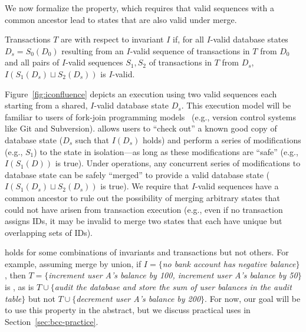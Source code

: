 We now formalize the \iconfluence property, which requires that valid
sequences with a common ancestor lead to states that are also valid
under merge.

\begin{definition}[\iconfluence]
Transactions $T$ are \iconfluent with respect to invariant $I$ if, for
all $I$-valid database states $D_s=S_0(D_0)$ resulting from an
$I$-valid sequence of transactions in $T$ from $D_0$ and all pairs of
$I$-valid sequences $S_1, S_2$ of transactions in $T$ from $D_s$,
$I(S_1(D_s) \sqcup S_2(D_s))$ is $I$-valid.
\end{definition}

Figure~\ref{fig:iconfluence} depicts an \iconfluent execution using
two valid sequences each starting from a shared, $I$-valid database
state $D_s$. This execution model will be familiar to users of
fork-join programming models~\cite{hewitt-forkjoin} (e.g., version
control systems like Git and Subversion). \iconfluence allows users to
``check out'' a known good copy of database state ($D_s$ such that
$I(D_s)$ holds) and perform a series of modifications (e.g., $S_1$) to
the state in isolation---as long as these modifications are ``safe''
(e.g., $I(S_1(D))$ is true). Under \iconfluent operations, any
concurrent series of modifications to database state can be safely
``merged'' to provide a valid database state ($I(S_1(D_s) \sqcup
S_2(D_s))$ is true). We require that $I$-valid sequences have a common
ancestor to rule out the possibility of merging arbitrary states that
could not have arisen from transaction execution (e.g., even if no
transaction assigns IDs, it may be invalid to merge two states that
each have unique but overlapping sets of IDs).

\iconfluence holds for some combinations of invariants and
transactions but not others. For example, assuming merge by union, if
$I=\{$\textit{no bank account has negative balance}$\}$, then
$T=\{$\textit{increment user A's balance by 100, increment user A's
  balance by 50}$\}$ is \iconfluent, as is $T\cup\{$\textit{audit the
  database and store the sum of user balances in the \textrm{audit}
  table}$\}$ but not $T\cup\{$\textit{decrement user A's balance by
  200}$\}$. For now, our goal will be to use this property in the
abstract, but we discuss practical uses in
Section~\ref{sec:bcc-practice}.

